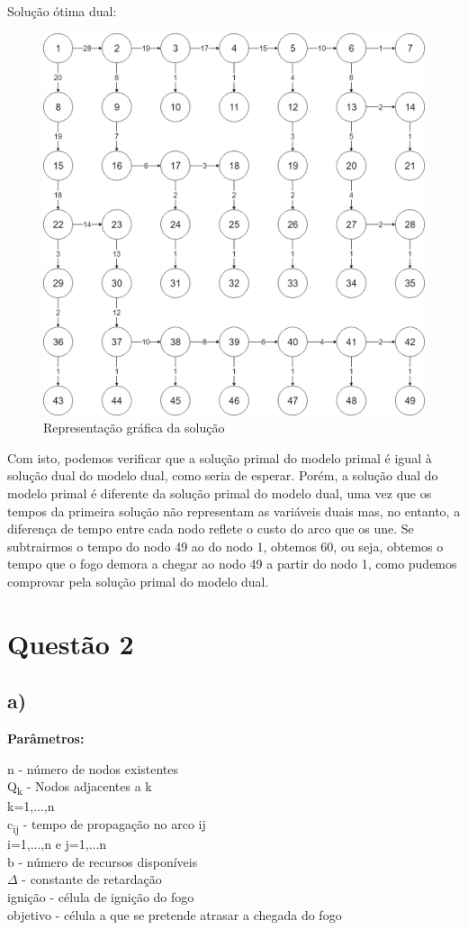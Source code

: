 \documentclass[11pt]{article} %
\begin{document}
Solução ótima dual:
\newpage
	\begin{figure}[!htpb]
		\centering
    		\includegraphics[width=5in]{grafo1c.png}
    		\caption{Representação gráfica da solução}
	\end{figure}
	
Com isto, podemos verificar que a solução primal do modelo primal é igual à solução dual do modelo dual, como seria de esperar. Porém, a solução dual do modelo primal é diferente da solução primal do modelo dual, uma vez que os tempos da primeira solução não representam as variáveis duais mas, no entanto, a diferença de tempo entre cada nodo reflete o custo do arco que os une. Se subtrairmos o tempo do nodo 49 ao do nodo 1, obtemos 60, ou seja, obtemos o tempo que o fogo demora a chegar ao nodo 49 a partir do nodo 1, como pudemos comprovar pela solução primal do modelo dual.

\newpage

\section*{Questão 2}
\subsection*{a)}
\textbf{Parâmetros:}  \\
\begin{center}
n - número de nodos existentes \\
Q\textsubscript{k} - Nodos adjacentes a k \\
k=1,...,n \\
c\textsubscript{ij} - tempo de propagação no arco ij\\
i=1,...,n e j=1,...n \\
b - número de recursos disponíveis \\
$\Delta$ - constante de retardação \\
ignição - célula de ignição do fogo \\
objetivo - célula a que se pretende atrasar a chegada do fogo
\end{center}
\end{document}
